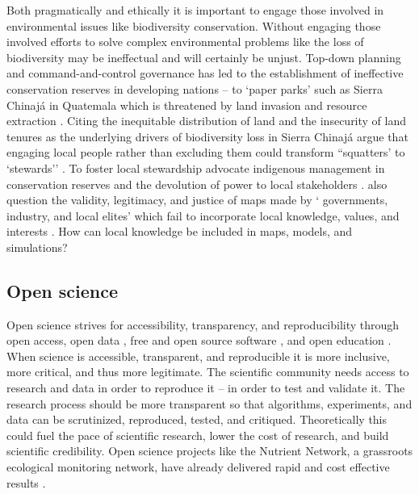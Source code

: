 \documentclass{article}
\begin{document}
Both pragmatically and ethically
it is important to engage those involved in environmental issues like biodiversity conservation. 
%
Without engaging those involved 
efforts to solve complex environmental problems like the loss of biodiversity may be ineffectual and will certainly be unjust.
%
%
Top-down planning and command-and-control governance has led to the establishment 
of ineffective conservation reserves in developing nations -- to `paper parks' 
such as Sierra Chinaj\'{a} in Quatemala which is threatened by land invasion and resource extraction 
\citep{Bonham2008}. 
%
Citing the inequitable distribution of land and the insecurity of land tenures 
as the underlying drivers of biodiversity loss in Sierra Chinaj\'{a}
\citeauthor{Bonham2008} argue that engaging local people rather than excluding them 
could transform ``squatters' to `stewards'' \citeyearpar{Bonham2008}. 
%
To foster local stewardship 
\citeauthor{Brosius2003} advocate indigenous management in conservation reserves 
and the devolution of power to local stakeholders 
\citeyearpar{Brosius2003}.
%
\citeauthor{Brosius2003} also question the validity, legitimacy, and justice of maps made by 
` governments, industry, and local elites' 
which fail to incorporate local knowledge, values, and interests 
\citeyearpar{Brosius2003}.
%
How can local knowledge be included in maps, models, and simulations? 

\subsection{Open science}
Open science strives for accessibility, transparency, and reproducibility
through open access, open data \citep{Boulton2012}, 
free and open source software \citep{Ince2012,Rocchini2012}, and
open education \citep{Petras2015}. 
When science is accessible, transparent, and reproducible 
it is more inclusive, more critical, and thus more legitimate. 
%
The scientific community needs access to research and data in order to reproduce it -- in order to test and validate it. 
The research process should be more transparent so that 
algorithms, experiments, and data can be scrutinized, reproduced, tested, and critiqued. 
Theoretically this could fuel the pace of scientific research, lower the cost of research, and build scientific credibility. 
Open science projects like the Nutrient Network, a grassroots ecological monitoring network, 
have already delivered rapid and cost effective results \citep{Stokstad2011}. 
\end{document}
